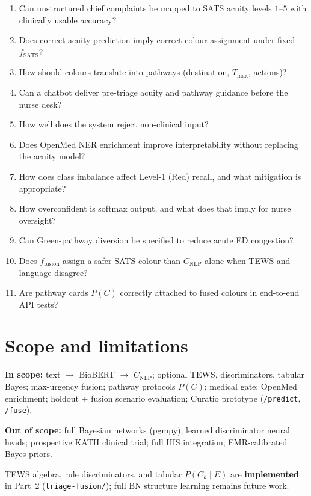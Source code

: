 \begin{enumerate}
  \item[\textbf{RQ1}] Can unstructured chief complaints be mapped to SATS acuity levels \(1\)--\(5\) with clinically usable accuracy?
  \item[\textbf{RQ2}] Does correct acuity prediction imply correct colour assignment under fixed \(f_{\mathrm{SATS}}\)?
  \item[\textbf{RQ3}] How should colours translate into pathways (destination, \(T_{\max}\), actions)?
  \item[\textbf{RQ4}] Can a chatbot deliver pre-triage acuity and pathway guidance before the nurse desk?
  \item[\textbf{RQ5}] How well does the system reject non-clinical input?
  \item[\textbf{RQ6}] Does OpenMed NER enrichment improve interpretability without replacing the acuity model?
  \item[\textbf{RQ7}] How does class imbalance affect Level-1 (Red) recall, and what mitigation is appropriate?
  \item[\textbf{RQ8}] How overconfident is softmax output, and what does that imply for nurse oversight?
  \item[\textbf{RQ9}] Can Green-pathway diversion be specified to reduce acute ED congestion?
  \item[\textbf{RQ10}] Does \(f_{\mathrm{fusion}}\) assign a safer SATS colour than \(C_{\mathrm{NLP}}\) alone when TEWS and language disagree?
  \item[\textbf{RQ11}] Are pathway cards \(P(C)\) correctly attached to fused colours in end-to-end API tests?
\end{enumerate}

\section{Scope and limitations}

\textbf{In scope:} text \(\to\) BioBERT \(\to\) \(C_{\mathrm{NLP}}\); optional TEWS, discriminators, tabular Bayes; max-urgency fusion; pathway protocols \(P(C)\); medical gate; OpenMed enrichment; holdout + fusion scenario evaluation; Curatio prototype (\texttt{/predict}, \texttt{/fuse}).

\textbf{Out of scope:} full Bayesian networks (pgmpy); learned discriminator neural heads; prospective KATH clinical trial; full HIS integration; EMR-calibrated Bayes priors.

TEWS algebra, rule discriminators, and tabular \(P(C_k\mid E)\) are \textbf{implemented} in Part~2 (\texttt{triage-fusion/}); full BN structure learning remains future work.

